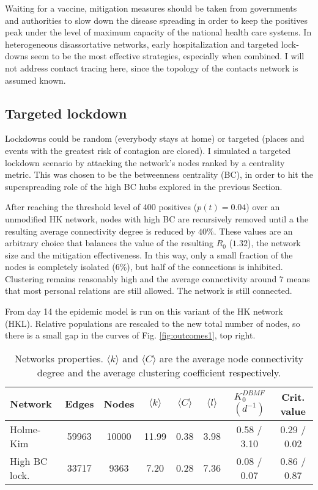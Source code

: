 \documentclass[DIV=12, BCOR=0pt]{scrartcl}  %
\begin{document}
	Waiting for a vaccine, mitigation measures should be taken from governments and authorities to slow down the disease spreading in order to keep the positives peak under the level of maximum capacity of the national health care systems. 
	In heterogeneous disassortative networks, early hospitalization and targeted lock-downs seem to be the most effective strategies, especially when combined. I will not address contact tracing here, since the topology of the contacts network is assumed known. 
	
	\subsection{Targeted lockdown}
	Lockdowns could be random (everybody stays at home) or targeted (places and events with the greatest risk of contagion are closed). I simulated a targeted lockdown scenario by attacking the network's nodes ranked by a centrality metric. This was chosen to be the betweenness centrality (BC), in order to hit the superspreading role of the high BC hubs explored in the previous Section.
	
	After reaching the threshold level of 400 positives ($p(t) = 0.04$) over an unmodified HK network, nodes with high BC are recursively removed until a the resulting average connectivity degree is reduced by $ 40 \%$. These values are an arbitrary choice that balances the value of the resulting $R_0$ ($1.32$), the network size and the mitigation effectiveness.
	In this way, only a small fraction of the nodes is completely isolated ($6 \%$), but half of the connections is inhibited. Clustering remains reasonably high and the average connectivity around $7$ means that most personal relations are still allowed. The network is still connected.
	
	From day 14 the epidemic model is run on this variant of the HK network (HKL). Relative populations are rescaled to the new total number of nodes, so there is a small gap in the curves of Fig. \ref{fig:outcomes1}, top right.
	
	\begin{table}[h]
		\centering
		\caption{Networks properties. $\langle k \rangle$ and $\langle C \rangle$ are the average node connectivity degree and the average clustering coefficient respectively. }
		\label{tab:lock_networks}
		\begin{tabular}{lccccccc}
			\toprule
			Network &  Edges &  Nodes & $\langle k \rangle$ & $\langle C \rangle$ & $\langle l \rangle$ & $K_0^{DBMF}$ $(d^{-1})$ & Crit. value \\
			\midrule
			Holme-Kim 		&  59963 &  10000 & 11.99 &  0.38 &  3.98 &  0.58 / 3.10 &   0.29 / 0.02 \\ 
			High BC lock.	&  33717 &   9363 &  7.20 &  0.28 &  7.36 &  0.08 / 0.07 &   0.86 / 0.87 \\
			
			\bottomrule
		\end{tabular}
	\end{table}
	
\end{document}
